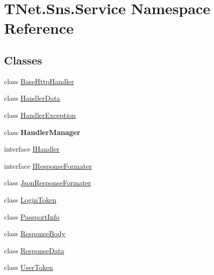 \hypertarget{namespace_t_net_1_1_sns_1_1_service}{}\section{T\+Net.\+Sns.\+Service Namespace Reference}
\label{namespace_t_net_1_1_sns_1_1_service}
\subsection*{Classes}
\begin{DoxyCompactItemize}
\item 
class \mbox{\hyperlink{class_t_net_1_1_sns_1_1_service_1_1_base_http_handler}{Base\+Http\+Handler}}
\item 
class \mbox{\hyperlink{class_t_net_1_1_sns_1_1_service_1_1_handler_data}{Handler\+Data}}
\item 
class \mbox{\hyperlink{class_t_net_1_1_sns_1_1_service_1_1_handler_exception}{Handler\+Exception}}
\item 
class {\bfseries Handler\+Manager}
\item 
interface \mbox{\hyperlink{interface_t_net_1_1_sns_1_1_service_1_1_i_handler}{I\+Handler}}
\item 
interface \mbox{\hyperlink{interface_t_net_1_1_sns_1_1_service_1_1_i_response_formater}{I\+Response\+Formater}}
\item 
class \mbox{\hyperlink{class_t_net_1_1_sns_1_1_service_1_1_json_response_formater}{Json\+Response\+Formater}}
\item 
class \mbox{\hyperlink{class_t_net_1_1_sns_1_1_service_1_1_login_token}{Login\+Token}}
\item 
class \mbox{\hyperlink{class_t_net_1_1_sns_1_1_service_1_1_passport_info}{Passport\+Info}}
\item 
class \mbox{\hyperlink{class_t_net_1_1_sns_1_1_service_1_1_response_body}{Response\+Body}}
\item 
class \mbox{\hyperlink{class_t_net_1_1_sns_1_1_service_1_1_response_data}{Response\+Data}}
\item 
class \mbox{\hyperlink{class_t_net_1_1_sns_1_1_service_1_1_user_token}{User\+Token}}
\end{DoxyCompactItemize}
